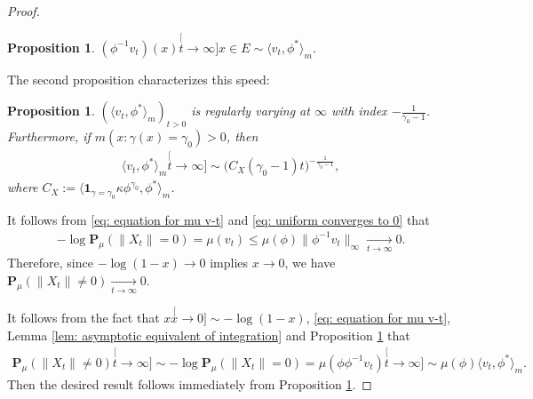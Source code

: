 \documentclass[12pt,a4paper]{amsart}
\newtheorem{prop}[thm]{Proposition}
\theoremstyle{definition}
\numberwithin{equation}{section}
\begin{document}
\begin{proof}
  \begin{prop}
    \label{prop: convergence in a same speed}
    $(\phi^{-1}v_t)(x) \stackrel[t\to\infty]{x\in E}{\sim} \langle v_t,\phi^*\rangle_m$.
  \end{prop}
  \label{prop: asymptotic equivalence of vtphi}
  The second proposition characterizes this speed:
  \begin{prop}
    \label{prop: regularly varying of vt-phi-star}
    $(\langle v_t,\phi^*\rangle_m)_{t> 0} $ is regularly varying at $\infty$ with index $-\frac{1}{\gamma_0-1}$.
    Furthermore, if $m(x: \gamma (x)= \gamma_0)>0$, then
    \begin{align}
      \langle v_t,\phi^*\rangle_m
      \stackrel[t\to \infty]{}{\sim} \big(C_X(\gamma_0-1) t \big)^{-\frac{1}{\gamma_0 - 1}},
    \end{align}
    where $C_X:= \langle \mathbf 1_{\gamma= \gamma_0} \kappa \phi^{\gamma_0}, \phi^* \rangle_m $.
  \end{prop}
 It follows from \eqref{eq: equation for mu v-t} and \eqref{eq: uniform converges to 0} that
    \begin{align}
      - \log \mathbf P_\mu(\|X_t\| = 0)
      = \mu(v_t)
      \leq \mu(\phi) \| \phi^{-1} v_t\|_{\infty}
      \xrightarrow[t\to \infty]{} 0.
    \end{align}
    Therefore, since $- \log (1-x) \to 0$ implies $x \to 0$, we have $\mathbf P_\mu(\|X_t\| \neq 0) \xrightarrow[t\to \infty]{} 0$.


It follows from the fact that $x \stackrel[x\to 0]{}{\sim} - \log(1-x)$, 
\eqref{eq: equation for mu v-t}, Lemma \ref{lem: asymptotic equivalent of integration} 
and Proposition \ref{prop: convergence in a same speed} that
    \begin{align}
      \mathbf P_\mu(\|X_t\| \neq 0)
      \stackrel[t\to \infty]{}{\sim} - \log \mathbf P_\mu(\|X_t\| = 0)
      = \mu(\phi \phi^{-1}v_t)
      \stackrel[t\to\infty]{}{\sim} \mu(\phi) \langle v_t, \phi^*\rangle_m.
    \end{align}
Then the desired result follows immediately from Proposition \ref{prop: regularly varying of vt-phi-star}.
\end{proof}
\end{document}
